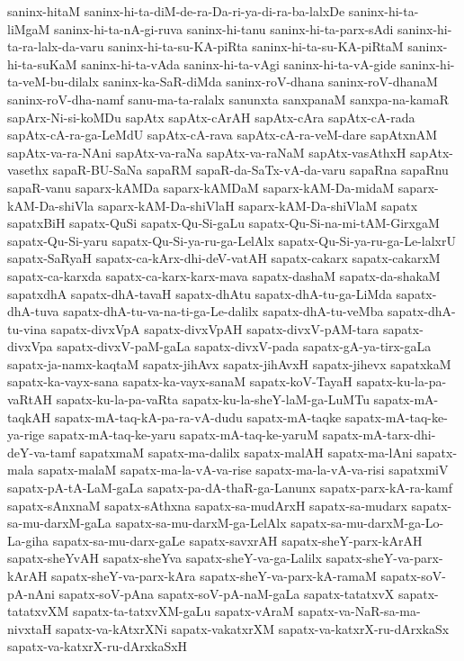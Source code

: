 {saninx-hitaM
saninx-hi-ta-diM-de-ra-Da-ri-ya-di-ra-ba-lalxDe
saninx-hi-ta-liMgaM
saninx-hi-ta-nA-gi-ruva
saninx-hi-tanu
saninx-hi-ta-parx-sAdi
saninx-hi-ta-ra-lalx-da-varu
saninx-hi-ta-su-KA-piRta
saninx-hi-ta-su-KA-piRtaM
saninx-hi-ta-suKaM
saninx-hi-ta-vAda
saninx-hi-ta-vAgi
saninx-hi-ta-vA-gide
saninx-hi-ta-veM-bu-dilalx
saninx-ka-SaR-diMda
saninx-roV-dhana
saninx-roV-dhanaM
saninx-roV-dha-namf
sanu-ma-ta-ralalx
sanunxta
sanxpanaM
sanxpa-na-kamaR
sapArx-Ni-si-koMDu
sapAtx
sapAtx-cArAH
sapAtx-cAra
sapAtx-cA-rada
sapAtx-cA-ra-ga-LeMdU
sapAtx-cA-rava
sapAtx-cA-ra-veM-dare
sapAtxnAM
sapAtx-va-ra-NAni
sapAtx-va-raNa
sapAtx-va-raNaM
sapAtx-vasAthxH
sapAtx-vasethx
sapaR-BU-SaNa
sapaRM
sapaR-da-SaTx-vA-da-varu
sapaRna
sapaRnu
sapaR-vanu
saparx-kAMDa
saparx-kAMDaM
saparx-kAM-Da-midaM
saparx-kAM-Da-shiVla
saparx-kAM-Da-shiVlaH
saparx-kAM-Da-shiVlaM
sapatx
sapatxBiH
sapatx-QuSi
sapatx-Qu-Si-gaLu
sapatx-Qu-Si-na-mi-tAM-GirxgaM
sapatx-Qu-Si-yaru
sapatx-Qu-Si-ya-ru-ga-LelAlx
sapatx-Qu-Si-ya-ru-ga-Le-lalxrU
sapatx-SaRyaH
sapatx-ca-kArx-dhi-deV-vatAH
sapatx-cakarx
sapatx-cakarxM
sapatx-ca-karxda
sapatx-ca-karx-karx-mava
sapatx-dashaM
sapatx-da-shakaM
sapatxdhA
sapatx-dhA-tavaH
sapatx-dhAtu
sapatx-dhA-tu-ga-LiMda
sapatx-dhA-tuva
sapatx-dhA-tu-va-na-ti-ga-Le-dalilx
sapatx-dhA-tu-veMba
sapatx-dhA-tu-vina
sapatx-divxVpA
sapatx-divxVpAH
sapatx-divxV-pAM-tara
sapatx-divxVpa
sapatx-divxV-paM-gaLa
sapatx-divxV-pada
sapatx-gA-ya-tirx-gaLa
sapatx-ja-namx-kaqtaM
sapatx-jihAvx
sapatx-jihAvxH
sapatx-jihevx
sapatxkaM
sapatx-ka-vayx-sana
sapatx-ka-vayx-sanaM
sapatx-koV-TayaH
sapatx-ku-la-pa-vaRtAH
sapatx-ku-la-pa-vaRta
sapatx-ku-la-sheY-laM-ga-LuMTu
sapatx-mA-taqkAH
sapatx-mA-taq-kA-pa-ra-vA-dudu
sapatx-mA-taqke
sapatx-mA-taq-ke-ya-rige
sapatx-mA-taq-ke-yaru
sapatx-mA-taq-ke-yaruM
sapatx-mA-tarx-dhi-deY-va-tamf
sapatxmaM
sapatx-ma-dalilx
sapatx-malAH
sapatx-ma-lAni
sapatx-mala
sapatx-malaM
sapatx-ma-la-vA-va-rise
sapatx-ma-la-vA-va-risi
sapatxmiV
sapatx-pA-tA-LaM-gaLa
sapatx-pa-dA-thaR-ga-Lanunx
sapatx-parx-kA-ra-kamf
sapatx-sAnxnaM
sapatx-sAthxna
sapatx-sa-mudArxH
sapatx-sa-mudarx
sapatx-sa-mu-darxM-gaLa
sapatx-sa-mu-darxM-ga-LelAlx
sapatx-sa-mu-darxM-ga-Lo-La-giha
sapatx-sa-mu-darx-gaLe
sapatx-savxrAH
sapatx-sheY-parx-kArAH
sapatx-sheYvAH
sapatx-sheYva
sapatx-sheY-va-ga-Lalilx
sapatx-sheY-va-parx-kArAH
sapatx-sheY-va-parx-kAra
sapatx-sheY-va-parx-kA-ramaM
sapatx-soV-pA-nAni
sapatx-soV-pAna
sapatx-soV-pA-naM-gaLa
sapatx-tatatxvX
sapatx-tatatxvXM
sapatx-ta-tatxvXM-gaLu
sapatx-vAraM
sapatx-va-NaR-sa-ma-nivxtaH
sapatx-va-kAtxrXNi
sapatx-vakatxrXM
sapatx-va-katxrX-ru-dArxkaSx
sapatx-va-katxrX-ru-dArxkaSxH
}
